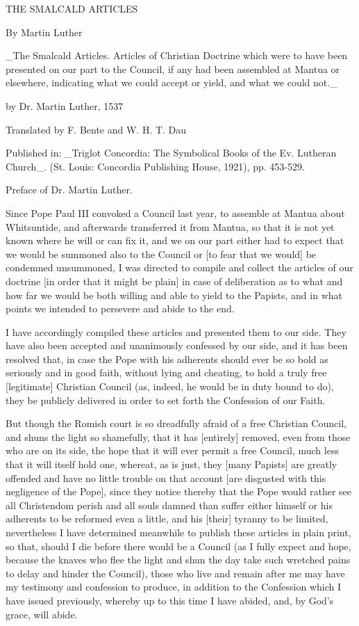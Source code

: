 THE SMALCALD ARTICLES

By Martin Luther


     _The Smalcald Articles.
     Articles of Christian Doctrine
     which were to have been presented on our part
     to the Council, if any had been assembled at Mantua
     or elsewhere, indicating what we could accept
     or yield, and what we could not._

     by Dr. Martin Luther, 1537

     Translated by F. Bente and  W. H. T. Dau

     Published in:
     _Triglot Concordia: The Symbolical Books
     of the Ev. Lutheran Church_.
     (St. Louis: Concordia Publishing House, 1921),
     pp. 453-529.




Preface of Dr. Martin Luther.

Since Pope Paul III convoked a Council last year, to assemble
at Mantua about Whitsuntide, and afterwards transferred it
from Mantua, so that it is not yet known where he will or can
fix it, and we on our part either had to expect that we would
be summoned also to the Council or [to fear that we would] be
condemned unsummoned, I was directed to compile and collect
the articles of our doctrine [in order that it might be plain]
in case of deliberation as to what and how far we would be
both willing and able to yield to the Papists, and in what
points we intended to persevere and abide to the end.

I have accordingly compiled these articles and presented them
to our side. They have also been accepted and unanimously
confessed by our side, and it has been resolved that, in case
the Pope with his adherents should ever be so bold as
seriously and in good faith, without lying and cheating, to
hold a truly free [legitimate] Christian Council (as, indeed,
he would be in duty bound to do), they be publicly delivered
in order to set forth the Confession of our Faith.

But though the Romish court is so dreadfully afraid of a free
Christian Council, and shuns the light so shamefully, that it
has [entirely] removed, even from those who are on its side,
the hope that it will ever permit a free Council, much less
that it will itself hold one, whereat, as is just, they [many
Papists] are greatly offended and have no little trouble on
that account [are disgusted with this negligence of the Pope],
since they notice thereby that the Pope would rather see all
Christendom perish and all souls damned than suffer either
himself or his adherents to be reformed even a little, and his
[their] tyranny to be limited, nevertheless I have determined
meanwhile to publish these articles in plain print, so that,
should I die before there would be a Council (as I fully
expect and hope, because the knaves who flee the light and
shun the day take such wretched pains to delay and hinder the
Council), those who live and remain after me may have my
testimony and confession to produce, in addition to the
Confession which I have issued previously, whereby up to this
time I have abided, and, by God's grace, will abide.

